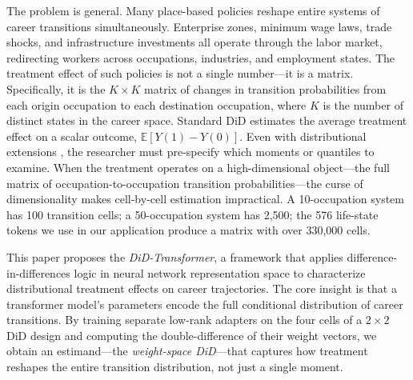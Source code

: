 \documentclass[12pt]{article}
\newcommand{\E}{\mathbb{E}}
\begin{document}
The problem is general. Many place-based policies reshape entire systems of career transitions simultaneously. Enterprise zones, minimum wage laws, trade shocks, and infrastructure investments all operate through the labor market, redirecting workers across occupations, industries, and employment states. The treatment effect of such policies is not a single number---it is a matrix. Specifically, it is the $K \times K$ matrix of changes in transition probabilities from each origin occupation to each destination occupation, where $K$ is the number of distinct states in the career space. Standard DiD estimates the average treatment effect on a scalar outcome, $\E[Y(1) - Y(0)]$. Even with distributional extensions \citep{callaway2019quantile, atheyImbens2006, firpo2009unconditional}, the researcher must pre-specify which moments or quantiles to examine. When the treatment operates on a high-dimensional object---the full matrix of occupation-to-occupation transition probabilities---the curse of dimensionality makes cell-by-cell estimation impractical. A 10-occupation system has 100 transition cells; a 50-occupation system has 2,500; the 576 life-state tokens we use in our application produce a matrix with over 330,000 cells.

This paper proposes the \textit{DiD-Transformer}, a framework that applies difference-in-differences logic in neural network representation space to characterize distributional treatment effects on career trajectories. The core insight is that a transformer model's parameters encode the full conditional distribution of career transitions. By training separate low-rank adapters on the four cells of a $2 \times 2$ DiD design and computing the double-difference of their weight vectors, we obtain an estimand---the \textit{weight-space DiD}---that captures how treatment reshapes the entire transition distribution, not just a single moment.
\end{document}
